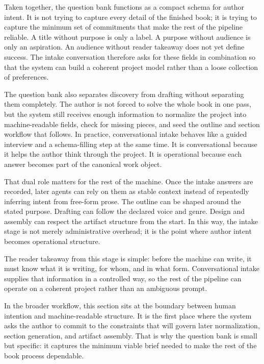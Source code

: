 \documentclass[11pt]{article}
\begin{document}
Taken together, the question bank functions as a compact schema for author intent. It is not trying to capture every detail of the finished book; it is trying to capture the minimum set of commitments that make the rest of the pipeline reliable. A title without purpose is only a label. A purpose without audience is only an aspiration. An audience without reader takeaway does not yet define success. The intake conversation therefore asks for these fields in combination so that the system can build a coherent project model rather than a loose collection of preferences.

The question bank also separates discovery from drafting without separating them completely. The author is not forced to solve the whole book in one pass, but the system still receives enough information to normalize the project into machine-readable fields, check for missing pieces, and seed the outline and section workflow that follows. In practice, conversational intake behaves like a guided interview and a schema-filling step at the same time. It is conversational because it helps the author think through the project. It is operational because each answer becomes part of the canonical work object.

That dual role matters for the rest of the machine. Once the intake answers are recorded, later agents can rely on them as stable context instead of repeatedly inferring intent from free-form prose. The outline can be shaped around the stated purpose. Drafting can follow the declared voice and genre. Design and assembly can respect the artifact structure from the start. In this way, the intake stage is not merely administrative overhead; it is the point where author intent becomes operational structure.

The reader takeaway from this stage is simple: before the machine can write, it must know what it is writing, for whom, and in what form. Conversational intake supplies that information in a controlled way, so the rest of the pipeline can operate on a coherent project rather than an ambiguous prompt.

In the broader workflow, this section sits at the boundary between human intention and machine-readable structure. It is the first place where the system asks the author to commit to the constraints that will govern later normalization, section generation, and artifact assembly. That is why the question bank is small but specific: it captures the minimum viable brief needed to make the rest of the book process dependable.
\end{document}
